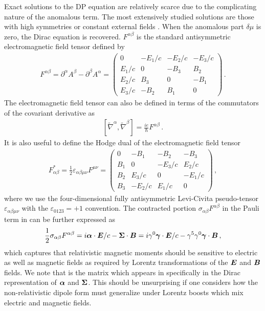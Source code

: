 Exact solutions to the DP equation are relatively scarce due to the complicating nature of the anomalous term. The most extensively studied solutions are those with high symmetries or constant external fields \citep{Thaller:1992ji}. When the anomalous part $\delta\mu$ is zero, the Dirac equation is recovered. $F^{\alpha\beta}$ is the standard antisymmetric electromagnetic field tensor defined by
\begin{gather}
    \label{em:1}
    F^{\alpha\beta} = \partial^{\alpha}A^{\beta} - \partial^{\beta}A^{\alpha} = 
    \begin{pmatrix}
        0        & -E_{1}/c  & -E_{2}/c  & -E_{3}/c\\
        E_{1}/c  & 0         & -B_{3}    & B_{2}\\
        E_{2}/c  & B_{3}     & 0         & -B_{1}\\
        E_{3}/c  & -B_{2}    & B_{1}     & 0
    \end{pmatrix}\,.
\end{gather}
The electromagnetic field tensor can also be defined in terms of the commutators of the covariant derivative  as
\begin{align}
    \label{curve:1}
    \left[\widetilde\nabla^{\alpha},\widetilde\nabla^{\beta}\right]=
    \frac{ie}{\hbar}F^{\alpha\beta}\,.
\end{align}
It is also useful to define the Hodge dual of the electromagnetic field tensor
\begin{gather}
    \label{em:2}
    F_{\alpha\beta}^{*} = \frac{1}{2}\varepsilon_{\alpha\beta\mu\nu}F^{\mu\nu} = 
    \begin{pmatrix}
        0        & -B_{1}  & -B_{2}  & -B_{3}\\
        B_{1}  & 0         & -E_{3}/c    & E_{2}/c\\
        B_{2}  & E_{3}/c     & 0         & -E_{1}/c\\
        B_{3}  & -E_{2}/c    & E_{1}/c     & 0
    \end{pmatrix}\,,
\end{gather}
where we use the four-dimensional fully antisymmetric Levi-Civita pseudo-tensor $\varepsilon_{\alpha\beta\mu\nu}$ with the $\varepsilon_{0123}=+1$ convention. The contracted portion $\sigma_{\alpha\beta}F^{\alpha\beta}$ in the Pauli term in  can be further expressed as
\begin{alignat}{1}
	\label{dp:2} \frac{1}{2}\sigma_{\alpha\beta}F^{\alpha\beta} = i\boldsymbol{\alpha}\cdot\boldsymbol{E}/c-\boldsymbol{\Sigma}\cdot\boldsymbol{B} = i\gamma^{0}\boldsymbol{\gamma}\cdot\boldsymbol{E}/c-\gamma^{5}\gamma^{0}\boldsymbol{\gamma}\cdot\boldsymbol{B}\,,
\end{alignat}
which captures that relativistic magnetic moments should be sensitive to electric as well as magnetic fields as required by Lorentz transformations of the $\boldsymbol{E}$ and $\boldsymbol{B}$ fields. We note that  is the matrix which appears in  specifically in the Dirac representation of $\boldsymbol{\alpha}$ and $\boldsymbol{\Sigma}$. This should be unsurprising if one considers how the non-relativistic dipole form must generalize under Lorentz boosts which mix electric and magnetic fields.

